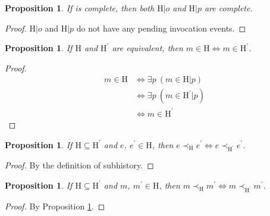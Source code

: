\documentclass[a4paper,USenglish]{lipics-v2016}
\newtheorem{prop}[theorem]{Proposition}
\newcommand{\his}{\text{H}}
\newcommand{\myvert}{\vert}
\begin{document}
\begin{prop}\label{lem_chis_2}
	If {\his} is complete, then both $\his \myvert o$ and $\his \myvert p$ are complete.
\end{prop}
\begin{proof}
	$\his \myvert o$ and $\his \myvert p$ do not have any pending invocation events.
\end{proof}

\begin{prop}\label{lem_his_eqiv}
	If $\his$ and $\his^\prime$ are equivalent, then $m \in \his \iff m \in \his^\prime$.
\end{prop}
\begin{proof}
	\begin{align*}
	m \in \his &\iff \exists p \ (m \in \his \myvert p)\\
	&\iff \exists p \ (m \in \his^\prime \myvert p)\\
	&\iff m \in \his^\prime
	\end{align*}
\end{proof}

\begin{prop}\label{lem_subhis_el}
	If $\his \subseteq \his^\prime$ and $e$, $e^\prime \in \his$,
	then $e \prec_{\his} e^\prime \iff e \prec_{\his^\prime} e^\prime$.
\end{prop}
\begin{proof}
	By the definition of subhistory.
\end{proof}

\begin{prop}\label{lem_subhis_ml}
	If $\his \subseteq \his^\prime$ and $m$, $m^\prime \in \his$,
	then $m \prec_{\his} m^\prime \iff m \prec_{\his^\prime} m^\prime$.
\end{prop}
\begin{proof}
	By Proposition \ref{lem_subhis_el}.
\end{proof}
\end{document}
